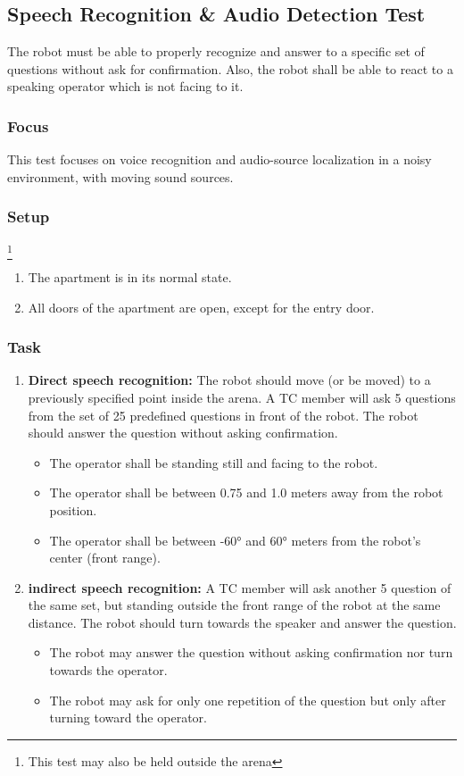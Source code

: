 \subsection{Speech Recognition \& Audio Detection Test}

The robot must be able to properly recognize and answer to a specific set of questions without ask for confirmation. Also, the robot shall be able to react to a speaking operator which is not facing to it.

\subsubsection{Focus}

This test focuses on voice recognition and audio-source localization in a noisy environment, with moving sound sources.

\subsubsection{Setup} \footnote{This test may also be held outside the arena}
\begin{enumerate}
\item The apartment is in its normal state.
\item All doors of the apartment are open, except for the entry door. 
\end{enumerate}

\subsubsection{Task}

\begin{enumerate}
\item \textbf{Direct speech recognition: } The robot should move (or be moved) to a previously specified point inside the arena. A TC member will ask 5 questions from the set of 25 predefined questions in front of the robot. The robot should answer the question without asking confirmation.
\begin{itemize}
\item The operator shall be standing still and facing to the robot.
\item The operator shall be between 0.75 and 1.0 meters away from the robot position.
\item The operator shall be between -60° and 60° meters from the robot's center (front range).
\end{itemize}
\item \textbf{indirect speech recognition: } A TC member will ask another 5 question of the same set, but standing outside the front range of the robot at the same distance. The robot should turn towards the speaker and answer the question.
\begin{itemize}
\item The robot may answer the question without asking confirmation nor turn towards the operator.
\item The robot may ask for only one repetition of the question but only after turning toward the operator.
\end{itemize}
\end{enumerate}


